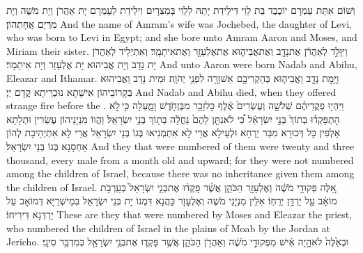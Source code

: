 {וְשׁוֹם אִתַּת עַמְרָם יוֹכֶבֶד בַּת לֵוִי דִּילֵידַת יָתַהּ לְלֵוִי בְּמִצְרָיִם וִילֵידַת לְעַמְרָם יָת אַהֲרֹן וְיָת מֹשֶׁה וְיָת מִרְיָם אֲחָתְהוֹן׃}
{And the name of Amram’s wife was Jochebed, the daughter of Levi, who was born to Levi in Egypt; and she bore unto Amram Aaron and Moses, and Miriam their sister.}{}
{וַיִּוָּלֵ֣ד לְאַהֲרֹ֔ן אֶת\maqqaf נָדָ֖ב וְאֶת\maqqaf אֲבִיה֑וּא אֶת\maqqaf אֶלְעָזָ֖ר וְאֶת\maqqaf אִיתָמָֽר׃}
{וְאִתְיְלֵיד לְאַהֲרֹן יָת נָדָב וְיָת אֲבִיהוּא יָת אֶלְעָזָר וְיָת אִיתָמָר׃}
{And unto Aaron were born Nadab and Abihu, Eleazar and Ithamar.}{}
{וַיָּ֥מׇת נָדָ֖ב וַאֲבִיה֑וּא בְּהַקְרִיבָ֥ם אֵשׁ\maqqaf זָרָ֖ה לִפְנֵ֥י יְהֹוָֽה׃}
{וּמִית נָדָב וַאֲבִיהוּא בְּקָרוֹבֵיהוֹן אִישָׁתָא נוּכְרֵיתָא קֳדָם יְיָ׃}
{And Nadab and Abihu died, when they offered strange fire before the \lord.}{}
{וַיִּהְי֣וּ פְקֻדֵיהֶ֗ם שְׁלֹשָׁ֤ה וְעֶשְׂרִים֙ אֶ֔לֶף כׇּל\maqqaf זָכָ֖ר מִבֶּן\maqqaf חֹ֣דֶשׁ וָמָ֑עְלָה כִּ֣י \legarmeh  לֹ֣א הׇתְפָּקְד֗וּ בְּתוֹךְ֙ בְּנֵ֣י יִשְׂרָאֵ֔ל כִּ֠י לֹא\maqqaf נִתַּ֤ן לָהֶם֙ נַחֲלָ֔ה בְּת֖וֹךְ בְּנֵ֥י יִשְׂרָאֵֽל׃}
{וַהֲווֹ מִנְיָנֵיהוֹן עֶשְׂרִין וּתְלָתָא אַלְפִין כָּל דְּכוּרָא מִבַּר יַרְחָא וּלְעֵילָא אֲרֵי לָא אִתְמְנִיאוּ בְּגוֹ בְּנֵי יִשְׂרָאֵל אֲרֵי לָא אִתְיְהֵיבַת לְהוֹן אַחְסָנָא בְּגוֹ בְּנֵי יִשְׂרָאֵל׃}
{And they that were numbered of them were twenty and three thousand, every male from a month old and upward; for they were not numbered among the children of Israel, because there was no inheritance given them among the children of Israel.}{}
{אֵ֚לֶּה פְּקוּדֵ֣י מֹשֶׁ֔ה וְאֶלְעָזָ֖ר הַכֹּהֵ֑ן אֲשֶׁ֨ר פָּֽקְד֜וּ אֶת\maqqaf בְּנֵ֤י יִשְׂרָאֵל֙ בְּעַֽרְבֹ֣ת מוֹאָ֔ב עַ֖ל יַרְדֵּ֥ן יְרֵחֽוֹ׃}
{אִלֵּין מִנְיָנֵי מֹשֶׁה וְאֶלְעָזָר כָּהֲנָא דִּמְנוֹ יָת בְּנֵי יִשְׂרָאֵל בְּמֵישְׁרַיָּא דְּמוֹאָב עַל יַרְדְּנָא דִּירִיחוֹ׃}
{These are they that were numbered by Moses and Eleazar the priest, who numbered the children of Israel in the plains of Moab by the Jordan at Jericho.}{}
{וּבְאֵ֙לֶּה֙ לֹא\maqqaf הָ֣יָה אִ֔ישׁ מִפְּקוּדֵ֣י מֹשֶׁ֔ה וְאַהֲרֹ֖ן הַכֹּהֵ֑ן אֲשֶׁ֥ר פָּקְד֛וּ אֶת\maqqaf בְּנֵ֥י יִשְׂרָאֵ֖ל בְּמִדְבַּ֥ר סִינָֽי׃}
